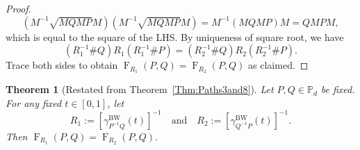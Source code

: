 \documentclass[12pt]{article}
\newtheorem{theorem}{Theorem}[section] %
\theoremstyle{definition}
\begin{document}
\begin{proof}
\begin{equation}
\left(M^{-1} \sqrt{M Q M P} M\right) \left(M^{-1} \sqrt{M Q M P} M\right) = M^{-1} (M Q M P) M = Q M P M,
\end{equation}
which is equal to the square of the LHS. By uniqueness of square root, we have
\begin{equation}
(R_1^{-1} \# Q) R_1 (R_1^{-1} \# P) = (R_2^{-1} \# Q) R_2 (R_2^{-1} \# P).
\end{equation}
Trace both sides to obtain $\operatorname{F}_{R_1}(P,Q) = \operatorname{F}_{R_2}(P,Q)$ as claimed.
\end{proof}


\begin{theorembox}
    \begin{theorem}[Restated from Theorem~\ref{Thm:Paths3and8}]\label{AppThm:Paths3and8}
        Let $P,Q \in \mathbb P_d$ be fixed. For any fixed $t \in [0,1]$, let 
        \begin{equation}
            R_1 := [\gamma_{P ^{-1} Q}^{\mathrm{BW}} (t)] ^{-1}  \quad \text{and} \quad R_2 := [\gamma_{Q^{-1} P }^{\mathrm{BW}} (t)] ^{-1} .
        \end{equation}
        Then $\operatorname{F}_{R_1}(P,Q) = \operatorname{F}_{R_2}(P,Q). $ 
    \end{theorem}
\end{theorembox}
\end{document}
